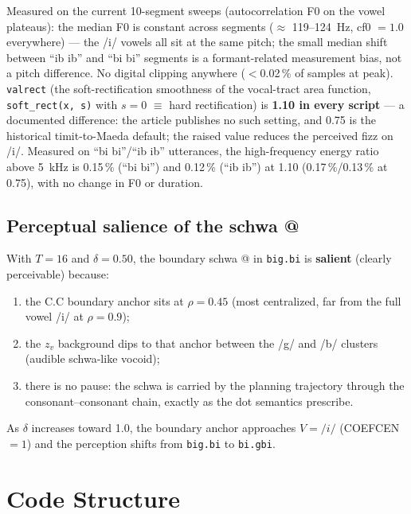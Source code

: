 \documentclass[11pt,a4paper]{article}
\begin{document}
Measured on the current 10-segment sweeps (autocorrelation F0 on the
vowel plateaus): the median F0 is constant across segments
($\approx$ 119--124~Hz, cf0 $= 1.0$ everywhere) --- the /i/ vowels all
sit at the same pitch; the small median shift between ``ib ib'' and
``bi bi'' segments is a formant-related measurement bias, not a pitch
difference. No digital clipping anywhere ($<$0.02\,\% of samples at
peak). \texttt{valrect} (the soft-rectification smoothness of the
vocal-tract area function, \texttt{soft\_rect(x, s)} with
$s = 0$ $\equiv$ hard rectification) is \textbf{1.10 in every
script} --- a documented difference: the article publishes no such
setting, and 0.75 is the historical timit-to-Maeda default; the raised
value reduces the perceived fizz on /i/.
Measured on ``bi bi''/``ib ib'' utterances, the high-frequency energy
ratio above 5~kHz is 0.15\,\% (``bi bi'') and 0.12\,\% (``ib ib'') at
1.10 (0.17\,\%/0.13\,\% at 0.75), with no change in F0 or duration.

\subsection{Perceptual salience of the schwa @}

With $T=16$ and $\delta = 0.50$, the boundary schwa @ in
\texttt{big.bi} is \textbf{salient} (clearly perceivable) because:
\begin{enumerate}
\item the C.C boundary anchor sits at $\rho = 0.45$ (most
  centralized, far from the full vowel /i/ at $\rho = 0.9$);
\item the $z_v$ background dips to that anchor between the /g/ and
  /b/ clusters (audible schwa-like vocoid);
\item there is no pause: the schwa is carried by the planning
  trajectory through the consonant--consonant chain, exactly as the
  dot semantics prescribe.
\end{enumerate}

As $\delta$ increases toward 1.0, the boundary anchor approaches
$V = /i/$ (COEFCEN $= 1$) and the perception shifts from
\texttt{big.bi} to \texttt{bi.gbi}.

\section{Code Structure}
\end{document}
